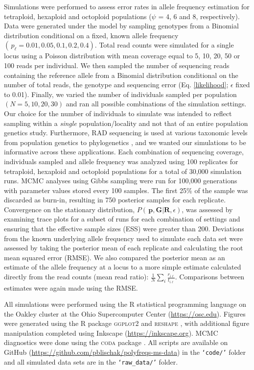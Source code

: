 \documentclass[11pt,english,letterpaper,oneside]{article}
\begin{document}
Simulations were performed to assess error rates in allele frequency estimation for tetraploid, hexaploid and octoploid populations ($\psi$ = 4, 6 and 8, respectively). Data were generated under the model by sampling genotypes from a Binomial distribution conditional on a fixed, known allele frequency $(\,p_{\ell} = 0.01, 0.05, 0.1, 0.2, 0.4)$. Total read counts were simulated for a single locus using a Poisson distribution with mean coverage equal to 5, 10, 20, 50 or 100 reads per individual. We then sampled the number of sequencing reads containing the reference allele from a Binomial distribution conditional on the number of total reads, the genotype and sequencing error (Eq. \ref{likelihood}; $\epsilon$ fixed to 0.01). Finally, we varied the number of individuals sampled per population $(N = 5, 10, 20, 30)$ and ran all possible combinations of the simulation settings. Our choice for the number of individuals to simulate was intended to reflect sampling within a \textit{single} population/locality and not that of an entire population genetics study. Furthermore, RAD sequencing is used at various taxonomic levels from population genetics to phylogenetics \citep[e.g.,][]{rheindt2013zimmerius,eaton2015oaks}, and we wanted our simulations to be informative across these applications. Each combination of sequencing coverage, individuals sampled and allele frequency was analyzed using 100 replicates for tetraploid, hexaploid and octoploid populations for a total of  30,000 simulation runs. MCMC analyses using Gibbs sampling were run for 100,000 generations with parameter values stored every 100 samples. The first 25\% of the sample was discarded as burn-in, resulting in 750 posterior samples for each replicate. Convergence on the stationary distribution, $P(\,\bm{p},\bm{G}|\bm{R},\epsilon)$, was assessed by examining trace plots for a subset of runs for each combination of settings and ensuring that the effective sample sizes (ESS) were greater than 200. Deviations from the known underlying allele frequency used to simulate each data set were assessed by taking the posterior mean of each replicate and calculating the root mean squared error (RMSE). We also compared the posterior mean as an estimate of the allele frequency at a locus to a more simple estimate calculated directly from the read counts (mean read ratio): $\frac{1}{N}\sum_i\frac{r_{i\ell}}{t_{i\ell}}$. Comparisons between estimates were again made using the RMSE.
\medskip

All simulations were performed using the R statistical programming language \citep{r2014} on the Oakley cluster at the Ohio Supercomputer Center (\url{https://osc.edu}). Figures were generated using the R package \textsc{ggplot2} \citep{wickham2009ggplot2} and \textsc{reshape} \citep{wickham2007reshape}, with additional figure manipulation completed using Inkscape (\url{https://inkscape.org}). MCMC diagnostics were done using the \textsc{coda} package \citep{plummer2006coda}. All scripts are available on GitHub (\url{https://github.com/pblischak/polyfreqs-ms-data}) in the \texttt{`code/'} folder and all simulated data sets are in the \texttt{`raw\_data/'} folder.
\medskip
\end{document}
